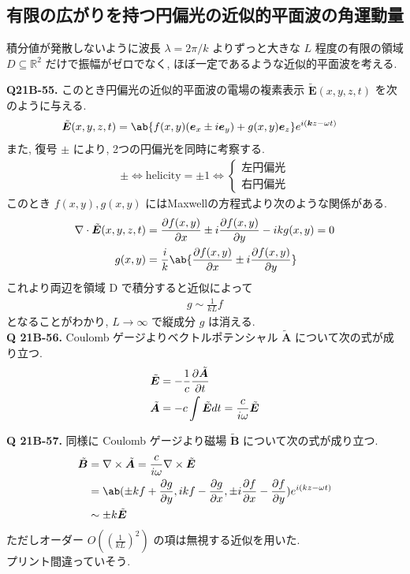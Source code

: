 \documentclass[uplatex,dvipdfmx,a4paper,11pt]{jlreq}
\newcommand{\RR}{\mathbb{R}}
\newcommand{\BB}{\bm{B}}
\renewcommand{\AA}{\bm{A}}
\newcommand{\kk}{\bm{k}}
\newcommand{\ET}{\tilde{\bm{E}}}
\newcommand{\vnabla}{\mathbf{\nabla}}
\theoremstyle{definition}
\begin{document}
\subsection{有限の広がりを持つ円偏光の近似的平面波の角運動量}
積分値が発散しないように波長 $\lambda=2\pi/k$ よりずっと大きな $L$ 程度の有限の領域 $D\subseteq\RR^2$ だけで振幅がゼロでなく, ほぼ一定であるような近似的平面波を考える. \\
\begin{proposition}[円筒対称性]
\end{proposition}

\textbf{Q21B-55.}
このとき円偏光の近似的平面波の電場の複素表示 $\ET(x,y,z,t)$ を次のように与える.
\begin{align}
  \ET(x,y,z,t) & = \ab\{f(x,y)(\bm{e}_x\pm i\bm{e}_y) + g(x,y)\bm{e}_z\}e^{i(\kk z-\omega t)} \label{def ET D}
\end{align}
また, 復号 $\pm$ により, 2つの円偏光を同時に考察する.
\begin{align}
  \pm\iff \mathrm{helicity} = \pm 1 \iff \begin{cases}
                                           左円偏光 \\
                                           右円偏光
                                         \end{cases}
\end{align}
このとき $f(x,y), g(x,y)$ にはMaxwellの方程式より次のような関係がある.
\begin{align}
  \nabla\cdot\ET(x,y,z,t) & = \diffp{f(x,y)}{x}\pm i\diffp{f(x,y)}{y} - i kg(x,y) = 0   \\
  g(x,y)                  & = \frac{i}{k}\ab\{\diffp{f(x,y)}{x}\pm i\diffp{f(x,y)}{y}\}
\end{align}
これより両辺を領域 D で積分すると近似によって
\begin{align}
  g\sim\frac{1}{kL}f
\end{align}
となることがわかり, $L\to\infty$ で縦成分 $g$ は消える. \\

\textbf{Q 21B-56.}
Coulomb ゲージよりベクトルポテンシャル $\tilde{\AA}$ について次の式が成り立つ.
\begin{align}
  \ET         & = -\frac{1}{c}\diffp{\tilde{\AA}}{t}  \\
  \tilde{\AA} & = -c\int\ET dt = \frac{c}{i\omega}\ET
\end{align}

\textbf{Q 21B-57.}
同様に Coulomb ゲージより磁場 $\tilde{\BB}$ について次の式が成り立つ.
\begin{align}
  \tilde{\BB} & = \vnabla\times\tilde{\AA} = \frac{c}{i\omega}\vnabla\times\ET                                      \\
              & = \ab(\pm kf + \diffp{g}{y}, ikf -\diffp{g}{x}, \pm i\diffp{f}{x} - \diffp{f}{y})e^{i(kz-\omega t)} \\
              & \sim \pm k\ET
\end{align}
ただしオーダー $O((\frac{1}{kL})^2)$ の項は無視する近似を用いた. \\
プリント間違っていそう. \\
\end{document}

